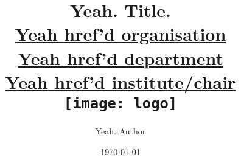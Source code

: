 \title{
\vspace{.5cm}
{Yeah. Title.}\\
\vspace{3cm}
{\large \href{}{Yeah href'd organisation}}\\
{\large \href{}{Yeah href'd department}}\\
{\large \href{}{Yeah href'd institute/chair}}\\
\vspace{2cm}
\texttt{[image: logo]}
\vspace{1cm}
}

\author{Yeah. Author}
\date{\today\\
    \vspace{2cm}}